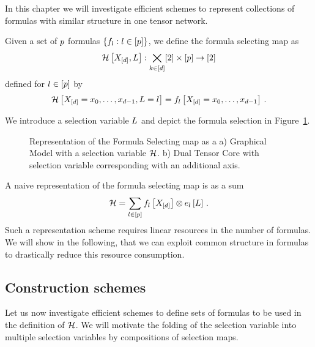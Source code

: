 \section{\chatextformulaSelection}\label{cha:formulaSelection}

In this chapter we will investigate efficient schemes to represent collections of formulas with similar structure in one tensor network.

\begin{definition}
	Given a set of $p$ formulas $\{f_{l} : l\in[p]\}$, we define the formula selecting map as
		\[  \mathcal{H}\left[X_{[d]},L\right] : \bigtimes_{k\in[d]}[2] \times [p] \rightarrow [2] \]
	defined for $l\in[p]$ by
		\[ \mathcal{H}\left[X_{[d]}={x_{0},\ldots,x_{d-1}},L=l\right] =  f_{l}\left[X_{[d]}={x_{0},\ldots,x_{d-1}}\right] \, . \]
\end{definition}

We introduce a selection variable $L$ and depict the formula selection in Figure~\ref{fig:formulaSelectionMap}.

\begin{figure}[h]
\begin{center}
	
\end{center}
\caption{Representation of the Formula Selecting map as a 
a) Graphical Model with a selection variable $\mathcal{H}$.
b) Dual Tensor Core with selection variable corresponding with an additional axis.}
\label{fig:formulaSelectionMap}
\end{figure}


A naive representation of the formula selecting map is as a sum
	\[ \mathcal{H} = \sum_{l\in[p]} f_{l}\left[X_{[d]}\right]  \otimes e_{l}\left[L\right] \, . \]
Such a representation scheme requires linear resources in the number of formulas.
We will show in the following, that we can exploit common structure in formulas to drastically reduce this resource consumption.



\subsection{Construction schemes}

Let us now investigate efficient schemes to define sets of formulas to be used in the definition of $\mathcal{H}$.
We will motivate the folding of the selection variable into multiple selection variables by compositions of selection maps.



